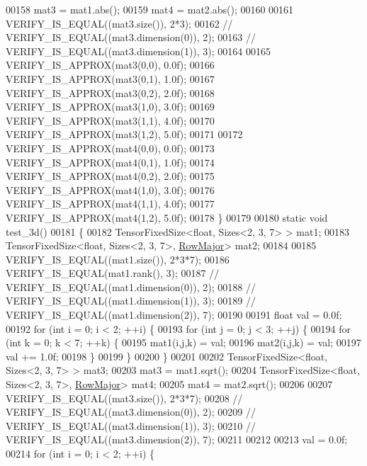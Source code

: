 \begin{DoxyCode}
00158   mat3 = mat1.abs();
00159   mat4 = mat2.abs();
00160 
00161   VERIFY\_IS\_EQUAL((mat3.size()), 2*3);
00162     \textcolor{comment}{//  VERIFY\_IS\_EQUAL((mat3.dimension(0)), 2);}
00163     \textcolor{comment}{//  VERIFY\_IS\_EQUAL((mat3.dimension(1)), 3);}
00164 
00165   VERIFY\_IS\_APPROX(mat3(0,0), 0.0f);
00166   VERIFY\_IS\_APPROX(mat3(0,1), 1.0f);
00167   VERIFY\_IS\_APPROX(mat3(0,2), 2.0f);
00168   VERIFY\_IS\_APPROX(mat3(1,0), 3.0f);
00169   VERIFY\_IS\_APPROX(mat3(1,1), 4.0f);
00170   VERIFY\_IS\_APPROX(mat3(1,2), 5.0f);
00171 
00172   VERIFY\_IS\_APPROX(mat4(0,0), 0.0f);
00173   VERIFY\_IS\_APPROX(mat4(0,1), 1.0f);
00174   VERIFY\_IS\_APPROX(mat4(0,2), 2.0f);
00175   VERIFY\_IS\_APPROX(mat4(1,0), 3.0f);
00176   VERIFY\_IS\_APPROX(mat4(1,1), 4.0f);
00177   VERIFY\_IS\_APPROX(mat4(1,2), 5.0f);
00178 \}
00179 
00180 \textcolor{keyword}{static} \textcolor{keywordtype}{void} test\_3d()
00181 \{
00182   TensorFixedSize<float, Sizes<2, 3, 7> > mat1;
00183   TensorFixedSize<float, Sizes<2, 3, 7>, \hyperlink{group__enums_ggaacded1a18ae58b0f554751f6cdf9eb13acfcde9cd8677c5f7caf6bd603666aae3}{RowMajor}> mat2;
00184 
00185   VERIFY\_IS\_EQUAL((mat1.size()), 2*3*7);
00186   VERIFY\_IS\_EQUAL(mat1.rank(), 3);
00187   \textcolor{comment}{//  VERIFY\_IS\_EQUAL((mat1.dimension(0)), 2);}
00188   \textcolor{comment}{//  VERIFY\_IS\_EQUAL((mat1.dimension(1)), 3);}
00189   \textcolor{comment}{//  VERIFY\_IS\_EQUAL((mat1.dimension(2)), 7);}
00190 
00191   \textcolor{keywordtype}{float} val = 0.0f;
00192   \textcolor{keywordflow}{for} (\textcolor{keywordtype}{int} i = 0; i < 2; ++i) \{
00193     \textcolor{keywordflow}{for} (\textcolor{keywordtype}{int} j = 0; j < 3; ++j) \{
00194       \textcolor{keywordflow}{for} (\textcolor{keywordtype}{int} k = 0; k < 7; ++k) \{
00195         mat1(i,j,k) = val;
00196         mat2(i,j,k) = val;
00197         val += 1.0f;
00198       \}
00199     \}
00200   \}
00201 
00202   TensorFixedSize<float, Sizes<2, 3, 7> > mat3;
00203   mat3 = mat1.sqrt();
00204   TensorFixedSize<float, Sizes<2, 3, 7>, \hyperlink{group__enums_ggaacded1a18ae58b0f554751f6cdf9eb13acfcde9cd8677c5f7caf6bd603666aae3}{RowMajor}> mat4;
00205   mat4 = mat2.sqrt();
00206 
00207   VERIFY\_IS\_EQUAL((mat3.size()), 2*3*7);
00208   \textcolor{comment}{//  VERIFY\_IS\_EQUAL((mat3.dimension(0)), 2);}
00209   \textcolor{comment}{//  VERIFY\_IS\_EQUAL((mat3.dimension(1)), 3);}
00210   \textcolor{comment}{//  VERIFY\_IS\_EQUAL((mat3.dimension(2)), 7);}
00211 
00212 
00213   val = 0.0f;
00214   \textcolor{keywordflow}{for} (\textcolor{keywordtype}{int} i = 0; i < 2; ++i) \{

\end{DoxyCode}
